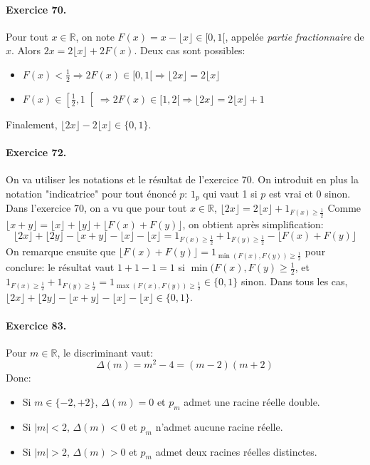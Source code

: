\documentclass[a4paper,11pt]{article}
\begin{document}
\paragraph{Exercice 70.} Pour tout $x\in\mathbb{R}$, on note $F(x)=x-\lfloor x \rfloor \in [0,1[$, appelée \textit{partie fractionnaire} de $x$. Alors $2x=2\lfloor x \rfloor + 2F(x)$. Deux cas sont possibles:
\begin{itemize}
  \item $F(x)<\frac{1}{2}\Rightarrow 2F(x)\in [0,1[ \Rightarrow \lfloor 2x \rfloor = 2\lfloor x \rfloor $
  \item $F(x)\in \left[\frac{1}{2}, 1\right[ \Rightarrow 2F(x)\in [1,2[ \Rightarrow \lfloor 2x \rfloor = 2\lfloor x \rfloor + 1$
\end{itemize}
Finalement, $\lfloor 2x \rfloor - 2\lfloor x \rfloor\in \{0,1\}$. 


\paragraph{Exercice 72.} On va utiliser les notations et le résultat de l'exercice 70. On introduit en plus la notation "indicatrice" pour tout énoncé $p$: $1_{p}$ qui vaut 1 si $p$ est vrai et 0 sinon. 
Dans l'exercice 70, on a vu que pour tout $x \in \mathbb{R}$,
 $\lfloor 2x \rfloor = 2\lfloor x \rfloor + 1_{F(x)\geq \frac{1}{2}}$
Comme $\lfloor x+y \rfloor = \lfloor x \rfloor  + \lfloor y \rfloor + \lfloor F(x)+F(y) \rfloor$, on obtient après simplification:
\[
\lfloor 2x \rfloor + \lfloor 2y \rfloor  - \lfloor x+y \rfloor  - \lfloor x \rfloor  - \lfloor x \rfloor = 1_{F(x)\geq \frac{1}{2}} + 1_{F(y)\geq \frac{1}{2}} - \lfloor F(x)+F(y) \rfloor 
\]
On remarque ensuite que $\lfloor F(x)+F(y) \rfloor = 1_{\min(F(x),F(y))\geq \frac{1}{2}}$ pour conclure: le résultat vaut $1+1-1=1$ si $\min(F(x), F(y)\geq \frac{1}{2}$, et $1_{F(x)\geq \frac{1}{2}} + 1_{F(y)\geq \frac{1}{2}} = 1_{\max(F(x), F(y))\geq \frac{1}{2}} \in \{0,1\}$ sinon. Dans tous les cas, $\lfloor 2x \rfloor + \lfloor 2y \rfloor  - \lfloor x+y \rfloor  - \lfloor x \rfloor  - \lfloor x \rfloor \in \{0,1\}$.

\paragraph{Exercice 83.} Pour $m\in\mathbb{R}$, le discriminant vaut:
\[
\Delta(m)=m^2-4=(m-2)(m+2)
\]
Donc:
\begin{itemize}
  \item Si $m\in\{-2,+2\}$, $\Delta(m)=0$ et $p_m$ admet une racine réelle double.
  \item Si $|m|<2$, $\Delta(m)<0$ et $p_m$ n'admet aucune racine réelle.
  \item Si $|m|>2$, $\Delta(m)>0$ et $p_m$ admet deux racines réelles distinctes.
\end{itemize}
\end{document}
